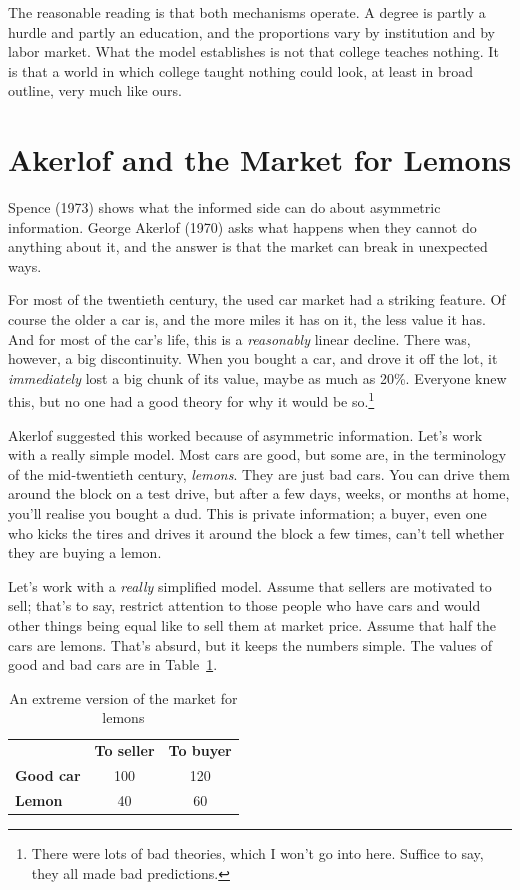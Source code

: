 \documentclass[
  11pt,
  letterpaper,
]{scrbook}
\begin{document}
The reasonable reading is that both mechanisms operate. A degree is
partly a hurdle and partly an education, and the proportions vary by
institution and by labor market. What the model establishes is not that
college teaches nothing. It is that a world in which college taught
nothing could look, at least in broad outline, very much like ours.

\section{Akerlof and the Market for Lemons}\label{sec-akerlof-lemons}

Spence (1973) shows what the informed side can do about asymmetric
information. George Akerlof (1970) asks what happens when they cannot do
anything about it, and the answer is that the market can break in
unexpected ways.

For most of the twentieth century, the used car market had a striking
feature. Of course the older a car is, and the more miles it has on it,
the less value it has. And for most of the car's life, this is a
\emph{reasonably} linear decline. There was, however, a big
discontinuity. When you bought a car, and drove it off the lot, it
\emph{immediately} lost a big chunk of its value, maybe as much as 20\%.
Everyone knew this, but no one had a good theory for why it would be
so.\footnote{There were lots of bad theories, which I won't go into
  here. Suffice to say, they all made bad predictions.}

Akerlof suggested this worked because of asymmetric information. Let's
work with a really simple model. Most cars are good, but some are, in
the terminology of the mid-twentieth century, \emph{lemons}. They are
just bad cars. You can drive them around the block on a test drive, but
after a few days, weeks, or months at home, you'll realise you bought a
dud. This is private information; a buyer, even one who kicks the tires
and drives it around the block a few times, can't tell whether they are
buying a lemon.

Let's work with a \emph{really} simplified model. Assume that sellers
are motivated to sell; that's to say, restrict attention to those people
who have cars and would other things being equal like to sell them at
market price. Assume that half the cars are lemons. That's absurd, but
it keeps the numbers simple. The values of good and bad cars are in
Table~\ref{tbl-lemons}.

\begin{longtable}[]{@{}lcc@{}}
\caption{An extreme version of the market for
lemons}\label{tbl-lemons}\tabularnewline
\toprule\noalign{}
\endfirsthead
\endhead
\bottomrule\noalign{}
\endlastfoot
& \textbf{To seller} & \textbf{To buyer} \\
\textbf{Good car} & 100 & 120 \\
\textbf{Lemon} & 40 & 60 \\
\end{longtable}
\end{document}
